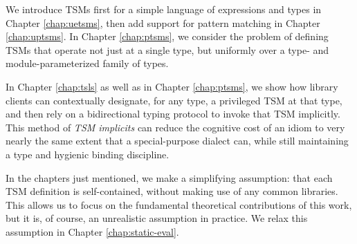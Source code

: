 We  introduce TSMs first for a simple language of expressions and types in Chapter \ref{chap:uetsms}, then add support for pattern matching  in Chapter \ref{chap:uptsms}. In Chapter \ref{chap:ptsms}, we consider the problem of defining TSMs that operate not just at a single type, but uniformly over a type- and module-parameterized family of types.

In Chapter \ref{chap:tsls} as well as in Chapter \ref{chap:ptsms}, we show how library clients can contextually designate, for any type, a privileged TSM at that type, and then rely on a bidirectional typing protocol to invoke that TSM implicitly. This method of \emph{TSM implicits} can reduce the cognitive cost of an idiom to very nearly the same extent that a special-purpose dialect can, while still maintaining a type and hygienic binding discipline.

In the chapters just mentioned, we make a simplifying assumption: that each TSM definition is self-contained, without making use of any common libraries. This allows us to focus on the fundamental theoretical contributions of this work, but it is, of course, an unrealistic assumption in practice. We relax this assumption in Chapter \ref{chap:static-eval}.

